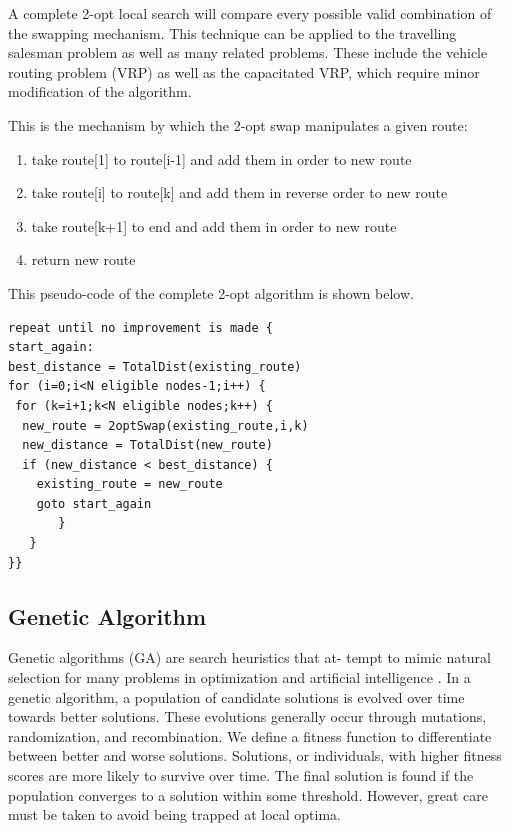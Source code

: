 \documentclass[10pt,twocolumn,letterpaper]{article}
\begin{document}
A complete 2-opt local search will compare every possible valid combination of the swapping mechanism. This technique can be applied to the travelling salesman problem as well as many related problems. These include the vehicle routing problem (VRP) as well as the capacitated VRP, which require minor modification of the algorithm.

This is the mechanism by which the 2-opt swap manipulates a given route:
\begin{enumerate}
\item take route[1] to route[i-1] and add them in order to new route
\item take route[i] to route[k] and add them in reverse order to new route
\item take route[k+1] to end and add them in order to new route
\item return new route
\end{enumerate}
 
This pseudo-code of the complete 2-opt algorithm is shown below.

\begin{lstlisting}
repeat until no improvement is made {
start_again:
best_distance = TotalDist(existing_route)
for (i=0;i<N eligible nodes-1;i++) {
 for (k=i+1;k<N eligible nodes;k++) {
  new_route = 2optSwap(existing_route,i,k)
  new_distance = TotalDist(new_route)
  if (new_distance < best_distance) {
	existing_route = new_route
	goto start_again
       }
   }
}}

\end{lstlisting}

\subsection{Genetic Algorithm}\label{sec:genetic}
Genetic algorithms (GA) are search heuristics that at-
tempt to mimic natural selection for many problems in optimization and artificial intelligence \cite{grefenstette1985genetic}. In a genetic algorithm, a population of candidate solutions is evolved over
time towards better solutions. These evolutions generally
occur through mutations, randomization, and recombination. We define a fitness function to differentiate between
better and worse solutions. Solutions, or individuals, with
higher fitness scores are more likely to survive over time.
The final solution is found if the population converges to a solution within some threshold. However, great care must
be taken to avoid being trapped at local optima.
\end{document}
